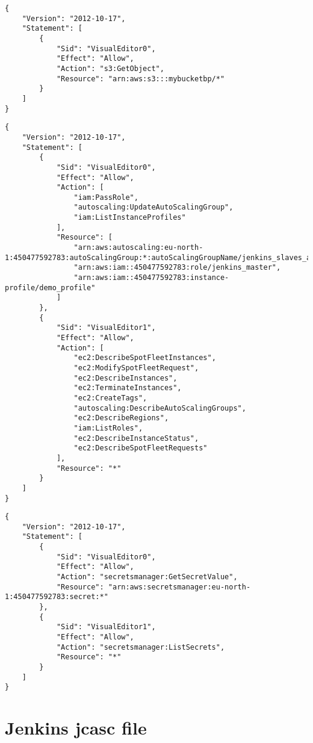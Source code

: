 \begin{lstlisting}[language=awsiampolicy, style=awsiampolicy]
{
	"Version": "2012-10-17",
	"Statement": [
		{
			"Sid": "VisualEditor0",
			"Effect": "Allow",
			"Action": "s3:GetObject",
			"Resource": "arn:aws:s3:::mybucketbp/*"
		}
	]
}
\end{lstlisting}

\begin{lstlisting}[language=awsiampolicy, style=awsiampolicy]
{
    "Version": "2012-10-17",
    "Statement": [
        {
            "Sid": "VisualEditor0",
            "Effect": "Allow",
            "Action": [
                "iam:PassRole",
                "autoscaling:UpdateAutoScalingGroup",
                "iam:ListInstanceProfiles"
            ],
            "Resource": [
                "arn:aws:autoscaling:eu-north-1:450477592783:autoScalingGroup:*:autoScalingGroupName/jenkins_slaves_autoscale_group",
                "arn:aws:iam::450477592783:role/jenkins_master",
                "arn:aws:iam::450477592783:instance-profile/demo_profile"
            ]
        },
        {
            "Sid": "VisualEditor1",
            "Effect": "Allow",
            "Action": [
                "ec2:DescribeSpotFleetInstances",
                "ec2:ModifySpotFleetRequest",
                "ec2:DescribeInstances",
                "ec2:TerminateInstances",
                "ec2:CreateTags",
                "autoscaling:DescribeAutoScalingGroups",
                "ec2:DescribeRegions",
                "iam:ListRoles",
                "ec2:DescribeInstanceStatus",
                "ec2:DescribeSpotFleetRequests"
            ],
            "Resource": "*"
        }
    ]
}
\end{lstlisting}

\begin{lstlisting}[language=awsiampolicy, style=awsiampolicy]
{
    "Version": "2012-10-17",
    "Statement": [
        {
            "Sid": "VisualEditor0",
            "Effect": "Allow",
            "Action": "secretsmanager:GetSecretValue",
            "Resource": "arn:aws:secretsmanager:eu-north-1:450477592783:secret:*"
        },
        {
            "Sid": "VisualEditor1",
            "Effect": "Allow",
            "Action": "secretsmanager:ListSecrets",
            "Resource": "*"
        }
    ]
}
\end{lstlisting}

\section{
{Jenkins jcasc file}}
\label{sec:Jenkins jcasc file}

